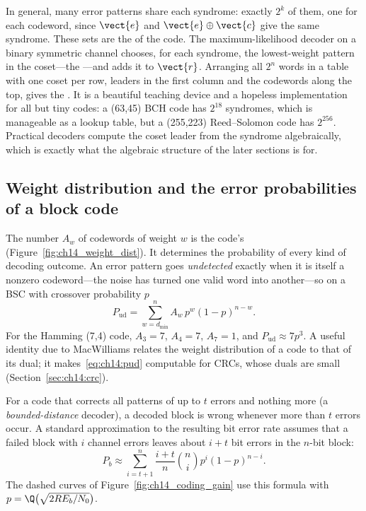 In general, many error patterns share each syndrome: exactly $2^k$ of them, one for each
codeword, since $\vect{e}$ and $\vect{e}\oplus\vect{c}$ give the same syndrome. These sets are
the  of the code. The maximum-likelihood decoder on a binary symmetric channel
chooses, for each syndrome, the lowest-weight pattern in the coset---the ---and
adds it to $\vect{r}$. Arranging all $2^n$ words in a table with one coset per row, leaders in the
first column and the codewords along the top, gives the . It is a
beautiful teaching device and a hopeless implementation for all but tiny codes: a (63,45) BCH code
has $2^{18}$ syndromes, which is manageable as a lookup table, but a (255,223) Reed--Solomon code
has $2^{256}$. Practical decoders compute the coset leader from the syndrome algebraically,
which is exactly what the algebraic structure of the later sections is for.

\subsection{Weight distribution and the error probabilities of a block code}


The number $A_w$ of codewords of weight $w$ is the code's 
(Figure~\ref{fig:ch14_weight_dist}). It determines the probability of every kind of decoding
outcome. An error pattern goes \emph{undetected} exactly when it is itself a nonzero codeword---the
noise has turned one valid word into another---so on a BSC with crossover probability $p$
\begin{equation}
P_{\text{ud}}=\sum_{w=d_{\min}}^{n}A_w\,p^w(1-p)^{n-w}.
\label{eq:ch14:pud}
\end{equation}
For the Hamming (7,4) code, $A_3=7$, $A_4=7$, $A_7=1$, and $P_{\text{ud}}\approx7p^3$. A useful
identity due to MacWilliams relates the weight distribution of a code to that of its dual; it
makes~\eqref{eq:ch14:pud} computable for CRCs, whose duals are small (Section~\ref{sec:ch14:crc}).

For a code that corrects all patterns of up to $t$ errors and nothing more (a
\emph{bounded-distance} decoder), a decoded block is wrong whenever more than $t$ errors occur.
A standard approximation to the resulting bit error rate assumes that a failed block with $i$
channel errors leaves about $i+t$ bit errors in the $n$-bit block:
\begin{equation}
P_b\approx\sum_{i=t+1}^{n}\frac{i+t}{n}\binom{n}{i}p^i(1-p)^{n-i}.
\label{eq:ch14:pbblock}
\end{equation}
The dashed curves of Figure~\ref{fig:ch14_coding_gain} use this formula with
$p=\Q\big(\sqrt{2RE_b/N_0}\big)$.

